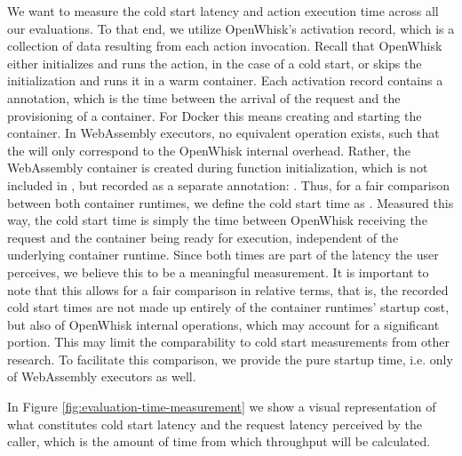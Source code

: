 We want to measure the cold start latency and action execution time across all our evaluations. To that end, we utilize OpenWhisk's activation record, which is a collection of data resulting from each action invocation.  Recall that OpenWhisk either initializes and runs the action, in the case of a cold start, or skips the initialization and runs it in a warm container. Each activation record contains a  annotation, which is the time between the arrival of the request and the provisioning of a container. For Docker this means creating and starting the container. In WebAssembly executors, no equivalent operation exists, such that the  will only correspond to the OpenWhisk internal overhead. Rather, the WebAssembly container is created during function initialization, which is not included in , but recorded as a separate annotation: . Thus, for a fair comparison between both container runtimes, we define the cold start time as . Measured this way, the cold start time is simply the time between OpenWhisk receiving the request and the container being ready for execution, independent of the underlying container runtime. Since both times are part of the latency the user perceives, we believe this to be a meaningful measurement. It is important to note that this allows for a fair comparison in relative terms, that is, the recorded cold start times are not made up entirely of the container runtimes' startup cost, but also of OpenWhisk internal operations, which may account for a significant portion. This may limit the comparability to cold start measurements from other research. To facilitate this comparison, we provide the pure startup time, i.e. only  of WebAssembly executors as well.


In Figure \ref{fig:evaluation-time-measurement} we show a visual representation of what constitutes cold start latency and the request latency perceived by the caller, which is the amount of time from which throughput will be calculated.

